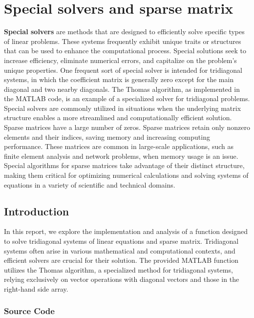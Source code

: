 \chapter{Special solvers and sparse matrix}
\textbf{Special solvers} are methods that are designed to efficiently solve specific types of linear problems. These systems frequently exhibit unique traits or structures that can be used to enhance the computational process. Special solutions seek to increase efficiency, eliminate numerical errors, and capitalize on the problem's unique properties.
\newline
One frequent sort of special solver is intended for tridiagonal systems, in which the coefficient matrix is generally zero except for the main diagonal and two nearby diagonals. The Thomas algorithm, as implemented in the MATLAB code, is an example of a specialized solver for tridiagonal problems. Special solvers are commonly utilized in situations when the underlying matrix structure enables a more streamlined and computationally efficient solution.
\newline
Sparse matrices have a large number of zeros. Sparse matrices retain only nonzero elements and their indices, saving memory and increasing computing performance. These matrices are common in large-scale applications, such as finite element analysis and network problems, when memory usage is an issue. Special algorithms for sparse matrices take advantage of their distinct structure, making them critical for optimizing numerical calculations and solving systems of equations in a variety of scientific and technical domains.


\section*{Introduction}

In this report, we explore the implementation and analysis of a function designed to solve tridiagonal systems of linear equations and sparse matrix. Tridiagonal systems often arise in various mathematical and computational contexts, and efficient solvers are crucial for their solution. The provided MATLAB function utilizes the Thomas algorithm, a specialized method for tridiagonal systems, relying exclusively on vector operations with diagonal vectors and those in the right-hand side array.

\subsection*{Source Code}

